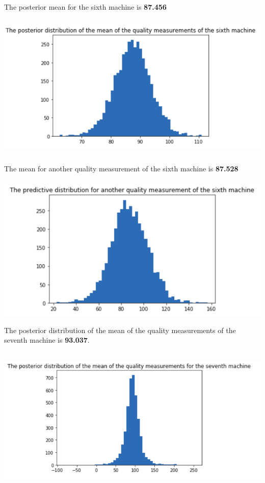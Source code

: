 \documentclass[17pt]{article}
\begin{document}
The posterior mean for the sixth machine is \textbf{87.456}\\
\begin{center}
\includegraphics[width=15cm, height=7cm]{mean_hierarchical.png}
\end{center}

The mean for another quality measurement of the sixth machine is \textbf{87.528}
\begin{center}
\includegraphics[width=15cm, height=7cm]{next_hierarchical.png}
\end{center}

\newpage

The posterior distribution of the mean of the quality measurements of the seventh machine is \textbf{93.037}.

\begin{center}
\includegraphics[width=15cm, height=7cm]{seventh_machine.png}
\end{center}
\end{document}
